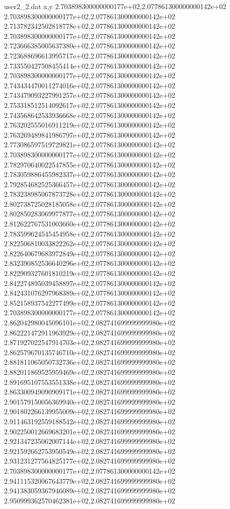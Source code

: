 \begin{filecontents}{user2_2.dat}
x,y
2.703898300000000177e+02,2.077861300000000142e+02
2.703898300000000177e+02,2.077861300000000142e+02
2.713782342502818778e+02,2.077861300000000142e+02
2.703898300000000177e+02,2.077861300000000142e+02
2.723666385005637380e+02,2.077861300000000142e+02
2.723688696613995717e+02,2.077861300000000142e+02
2.733550427508455414e+02,2.077861300000000142e+02
2.703898300000000177e+02,2.077861300000000142e+02
2.743434470011274016e+02,2.077861300000000142e+02
2.743479093227991257e+02,2.077861300000000142e+02
2.753318512514092617e+02,2.077861300000000142e+02
2.743568642533936668e+02,2.077861300000000142e+02
2.763202555016911219e+02,2.077861300000000142e+02
2.763269489841986797e+02,2.077861300000000142e+02
2.773086597519729821e+02,2.077861300000000142e+02
2.703898300000000177e+02,2.077861300000000142e+02
2.782970640022547855e+02,2.077861300000000142e+02
2.783059886455982337e+02,2.077861300000000142e+02
2.792854682525366457e+02,2.077861300000000142e+02
2.783238985067873728e+02,2.077861300000000142e+02
2.802738725028185058e+02,2.077861300000000142e+02
2.802850283069977877e+02,2.077861300000000142e+02
2.812622767531003660e+02,2.077861300000000142e+02
2.783599624545454958e+02,2.077861300000000142e+02
2.822506810033822262e+02,2.077861300000000142e+02
2.822640679683972849e+02,2.077861300000000142e+02
2.832390852536640296e+02,2.077861300000000142e+02
2.822909327601810219e+02,2.077861300000000142e+02
2.842274895039458897e+02,2.077861300000000142e+02
2.842431076297968389e+02,2.077861300000000142e+02
2.852158937542277499e+02,2.077861300000000142e+02
2.703898300000000177e+02,2.077861300000000142e+02
2.862042980045096101e+02,2.082741699999999980e+02
2.862221472911963929e+02,2.082741699999999980e+02
2.871927022547914703e+02,2.082741699999999980e+02
2.862579670135746710e+02,2.082741699999999980e+02
2.881811065050732736e+02,2.082741699999999980e+02
2.882011869525959469e+02,2.082741699999999980e+02
2.891695107553551338e+02,2.082741699999999980e+02
2.863300949090909171e+02,2.082741699999999980e+02
2.901579150056369940e+02,2.082741699999999980e+02
2.901802266139955009e+02,2.082741699999999980e+02
2.911463192559188542e+02,2.082741699999999980e+02
2.902250012669683201e+02,2.082741699999999980e+02
2.921347235062007144e+02,2.082741699999999980e+02
2.921592662753950549e+02,2.082741699999999980e+02
2.931231277564825177e+02,2.082741699999999980e+02
2.703898300000000177e+02,2.077861300000000142e+02
2.941115320067643779e+02,2.082741699999999980e+02
2.941383059367946089e+02,2.082741699999999980e+02
2.950999362570462381e+02,2.082741699999999980e+02

\end{filecontents}
